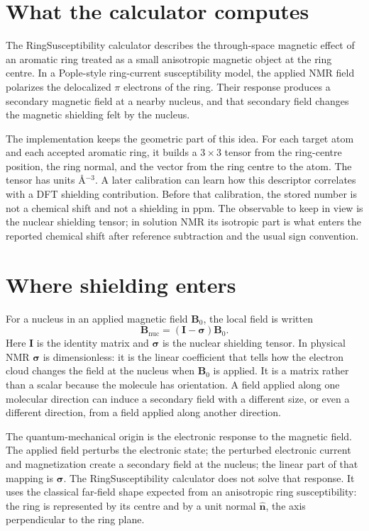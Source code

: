 \documentclass[11pt]{article}
\begin{document}

\section{What the calculator computes}

The RingSusceptibility calculator describes the through-space magnetic effect
of an aromatic ring treated as a small anisotropic magnetic object at the ring
centre. In a Pople-style ring-current susceptibility model, the applied NMR
field polarizes the delocalized \(\pi\) electrons of the ring. Their response
produces a secondary magnetic field at a nearby nucleus, and that secondary
field changes the magnetic shielding felt by the nucleus.

The implementation keeps the geometric part of this idea. For each target atom
and each accepted aromatic ring, it builds a \(3\times 3\) tensor from the
ring-centre position, the ring normal, and the vector from the ring centre to
the atom. The tensor has units \(\si{\angstrom^{-3}}\). A later calibration can
learn how this descriptor correlates with a DFT shielding contribution. Before
that calibration, the stored number is not a chemical shift and not a shielding
in ppm. The observable to keep in view is the nuclear shielding tensor; in
solution NMR its isotropic part is what enters the reported chemical shift after
reference subtraction and the usual sign convention.

\section{Where shielding enters}

For a nucleus in an applied magnetic field \(\bm B_0\), the local field is
written
\begin{equation}
  \bm B_{\mathrm{nuc}} = (\bm I-\bm\sigma)\bm B_0 .
  \label{eq:shielding}
\end{equation}
Here \(\bm I\) is the identity matrix and \(\bm\sigma\) is the nuclear shielding
tensor. In physical NMR \(\bm\sigma\) is dimensionless: it is the linear
coefficient that tells how the electron cloud changes the field at the nucleus
when \(\bm B_0\) is applied. It is a matrix rather than a scalar because the
molecule has orientation. A field applied along one molecular direction can
induce a secondary field with a different size, or even a different direction,
from a field applied along another direction.

The quantum-mechanical origin is the electronic response to the magnetic field.
The applied field perturbs the electronic state; the perturbed electronic
current and magnetization create a secondary field at the nucleus; the linear
part of that mapping is \(\bm\sigma\). The RingSusceptibility calculator does
not solve that response. It uses the classical far-field shape expected from an
anisotropic ring susceptibility: the ring is represented by its centre and by a
unit normal \(\hat{\bm n}\), the axis perpendicular to the ring plane.
\end{document}

